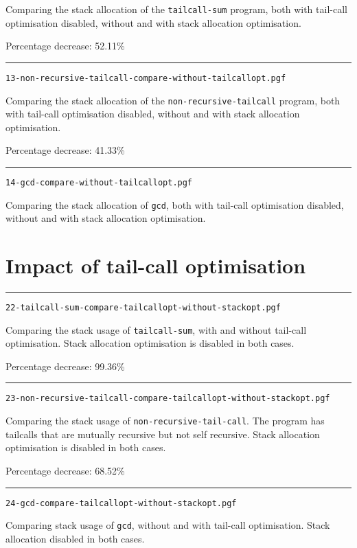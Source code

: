 \documentclass{article}
\newcommand{\plot}[1]{
\rule{\textwidth}{1pt}
\texttt{#1}

\fbox{\resizebox{\textwidth}{!}{}}
}
\begin{document}
Comparing the stack allocation of the \texttt{tailcall-sum} program, both with tail-call optimisation disabled, without and with stack allocation optimisation.

Percentage decrease: 52.11\%

\plot{13-non-recursive-tailcall-compare-without-tailcallopt.pgf}

Comparing the stack allocation of the \texttt{non-recursive-tailcall} program, both with tail-call optimisation disabled, without and with stack allocation optimisation.

Percentage decrease: 41.33\%

\plot{14-gcd-compare-without-tailcallopt.pgf}

Comparing the stack allocation of \texttt{gcd}, both with tail-call optimisation disabled, without and with stack allocation optimisation.



\newpage
\section{Impact of tail-call optimisation}

\plot{22-tailcall-sum-compare-tailcallopt-without-stackopt.pgf}

Comparing the stack usage of \texttt{tailcall-sum}, with and without tail-call optimisation. Stack allocation optimisation is disabled in both cases.

Percentage decrease: 99.36\%

\plot{23-non-recursive-tailcall-compare-tailcallopt-without-stackopt.pgf}

Comparing the stack usage of \texttt{non-recursive-tail-call}.
The program has tailcalls that are mutually recursive but not self recursive.
Stack allocation optimisation is disabled in both cases.

Percentage decrease: 68.52\%

\plot{24-gcd-compare-tailcallopt-without-stackopt.pgf}

Comparing stack usage of \texttt{gcd}, without and with tail-call optimisation. Stack allocation disabled in both cases.
\end{document}
